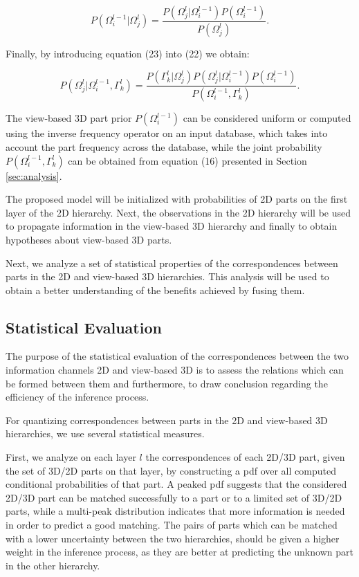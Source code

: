 \documentclass[runningheads]{llncs}
\begin{document}
\begin{equation}
 P(\Omega_i^{l-1} \vert \Omega_j^{l}) = \frac{P(\Omega_j^{l}\vert \Omega_i^{l-1})P(\Omega_i^{l-1})}{P(\Omega_j^{l})}.
 \end{equation}

Finally, by introducing equation (23) into (22) we obtain:

\begin{equation}
 P(\Omega_j^{l} \vert \Omega_i^{l-1},\Gamma_k^l) = \frac{P(\Gamma_k^l \vert \Omega_j^{l})P(\Omega_j^{l} \vert \Omega_i^{l-1})P(\Omega_i^{l-1})}{P(\Omega_i^{l-1},\Gamma_k^l)}.
\end{equation}
  
The view-based 3D part prior $P(\Omega_i^{l-1})$ can be considered uniform or computed using the inverse frequency operator on an input database, which takes into account the part frequency across the database, while the joint probability $P(\Omega_i^{l-1},\Gamma_k^l)$ can be obtained from equation (16) presented in Section \ref{sec:analysis}.

The proposed model will be initialized with probabilities of 2D parts on the first layer of the 2D hierarchy. Next, the observations in the 2D hierarchy will be used to propagate information in the view-based 3D hierarchy and finally to obtain hypotheses about view-based 3D parts. 

Next, we analyze a set of statistical properties of the correspondences between parts in the 2D and view-based 3D hierarchies. This analysis will be used to obtain a better understanding of the benefits achieved by fusing them.

\subsection{Statistical Evaluation}
\label{sec:statistical}

The purpose of the statistical evaluation of the correspondences between the two information channels 2D and view-based 3D is to assess the relations which can be formed between them and furthermore, to draw conclusion regarding the efficiency of the inference process. 

For quantizing correspondences between parts in the 2D and view-based 3D hierarchies, we use several statistical measures.

First, we analyze on each layer $l$ the correspondences of each 2D/3D part, given the set of 3D/2D parts on that layer, by constructing a pdf over all computed conditional probabilities of that part. A peaked pdf suggests that the considered 2D/3D part can be matched successfully to a part or to a limited set of 3D/2D parts, while a multi-peak distribution indicates that more information is needed in order to predict a good matching. The pairs of parts which can be matched with a lower uncertainty between the two hierarchies, should be given a higher weight in the inference process, as they are better at predicting the unknown part in the other hierarchy.
\end{document}
